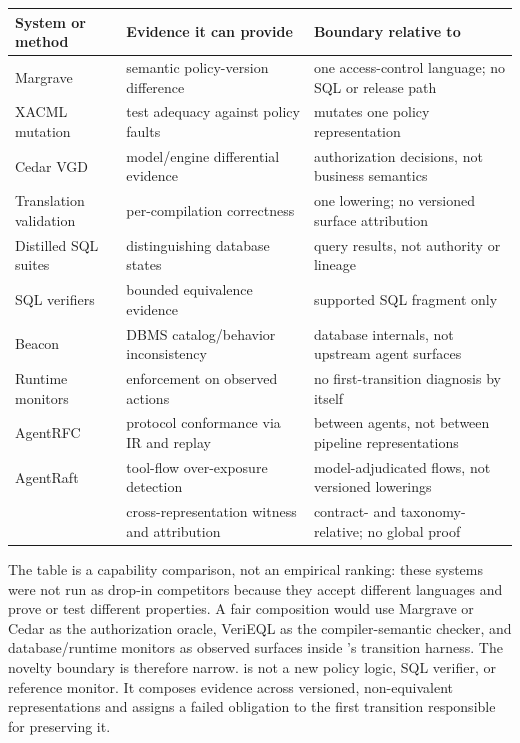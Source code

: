 \begin{center}
\scriptsize
\setlength{\tabcolsep}{2pt}
\begin{tabular}{@{}L{0.24\columnwidth}L{0.31\columnwidth}L{0.35\columnwidth}@{}}
\toprule
System or method & Evidence it can provide & Boundary relative to \policystrata{} \\
\midrule
Margrave & semantic policy-version difference & one access-control language; no SQL or release path \\
XACML mutation & test adequacy against policy faults & mutates one policy representation \\
Cedar VGD & model/engine differential evidence & authorization decisions, not business semantics \\
Translation validation & per-compilation correctness & one lowering; no versioned surface attribution \\
Distilled SQL suites & distinguishing database states & query results, not authority or lineage \\
SQL verifiers & bounded equivalence evidence & supported SQL fragment only \\
Beacon & DBMS catalog/behavior inconsistency & database internals, not upstream agent surfaces \\
Runtime monitors & enforcement on observed actions & no first-transition diagnosis by itself \\
AgentRFC & protocol conformance via IR and replay & between agents, not between pipeline representations \\
AgentRaft & tool-flow over-exposure detection & model-adjudicated flows, not versioned lowerings \\
\policystrata{} & cross-representation witness and attribution & contract- and taxonomy-relative; no global proof \\
\bottomrule
\end{tabular}
\end{center}

The table is a capability comparison, not an empirical ranking: these systems were not run as drop-in competitors because they accept different languages and prove or test different properties. A fair composition would use Margrave or Cedar as the authorization oracle, VeriEQL as the compiler-semantic checker, and database/runtime monitors as observed surfaces inside \policystrata{}'s transition harness. The novelty boundary is therefore narrow. \policystrata{} is not a new policy logic, SQL verifier, or reference monitor. It composes evidence across versioned, non-equivalent representations and assigns a failed obligation to the first transition responsible for preserving it.
